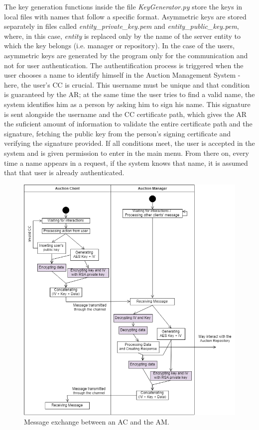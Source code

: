 \documentclass[a4paper]{article}
\begin{document}
The key generation functions inside the file \emph{KeyGenerator.py} store the keys in local files with names that follow a specific format.
Asymmetric keys are stored separately in files called \emph{entity\_private\_key.pem} and \emph{entity\_public\_key.pem}, where, in this case, \emph{entity} is replaced only by the name of the server entity to which the key belongs (i.e. manager or repository).
In the case of the users, asymmetric keys are generated by the program only for the communication and not for user authentication.
The authentification process is triggered when the user chooses a name to identify himself in the Auction Management System - here, the user's CC is crucial. 
This username must be unique and that condition is guaranteed by the AR; at the same time the user tries to find a valid name, the system identifies him as a person by asking him to sign his name. 
This signature is sent alongside the username and the CC certificate path, which gives the AR the suficient amount of information to validate the entire certificate path and the signature, fetching the public key from the person's signing certificate and verifying the signature provided. 
If all conditions meet, the user is accepted in the system and is given permission to enter in the main menu. 
From there on, every time a name appears in a request, if the system knows that name, it is assumed that that user is already authenticated.

\begin{figure}[H]
\centering
\includegraphics[width=0.9\linewidth]{ME.png}
\caption{Message exchange between an AC and the AM.}
\label{fig:me}
\end{figure}
\end{document}
